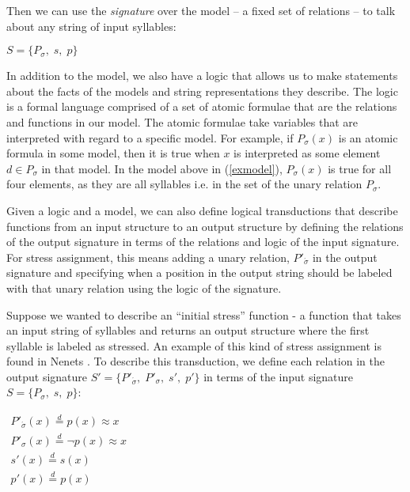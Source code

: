 \documentclass[12pt]{article}
\newcommand{\sig}{\sigma}
\newcommand{\deq}{\stackrel{d}{=}}
\newcommand{\ass}{\acute{\sig}}
\begin{document}
\noindent
Then we can use the \textit{signature} over the model -- a fixed set of relations -- to talk about any string of input syllables:

\begin{exe}
\item $S = \lbrace P_\sig, \; s, \; p \rbrace $
\end{exe}

\noindent
In addition to the model, we also have a logic that allows us to make statements about the facts of the models and string representations they describe. The logic is a formal language comprised of a set of atomic formulae that are the relations and functions in our model. The atomic formulae take variables that are interpreted with regard to a specific model. For example, if $P_\sig(x)$ is an atomic formula in some model, then it is true when $x$ is interpreted as some element $d \in P_\sig$ in that model. In the model above in (\ref{exmodel}), $P_\sig(x)$ is true for all four elements, as they are all syllables i.e. in the set of the unary relation $P_\sig$.

Given a logic and a model, we can also define logical transductions \citep{courcelle94} that describe functions from an input structure to an output structure by defining the relations of the output signature in terms of the relations and logic of the input signature. For stress assignment, this means adding a unary relation, $P'_\ass$ in the output signature and specifying when a position in the output string should be labeled with that unary relation using the logic of the signature. 

Suppose we wanted to describe an ``initial stress'' function - a function that takes an input string of syllables and returns an output structure where the first syllable is labeled as stressed. An example of this kind of stress assignment is found in Nenets \citep{decsy66}. To describe this transduction, we define each relation in the output signature $S' = \lbrace P'_\ass, \; P'_\sig, \; s', \; p' \rbrace$ in terms of the input signature $S = \lbrace P_\sig, \; s, \; p \rbrace $: 

\begin{exe}
\item $\begin{array}{l}
   P'_\ass(x) \deq  p(x) \approx x  \\
   P'_\sig(x) \deq  \neg p(x) \approx x  \\
   s'(x) \deq s(x)    \\
   p'(x) \deq p(x)
     
\end{array} $
\label{exampleoutput}
\end{exe}
\end{document}
